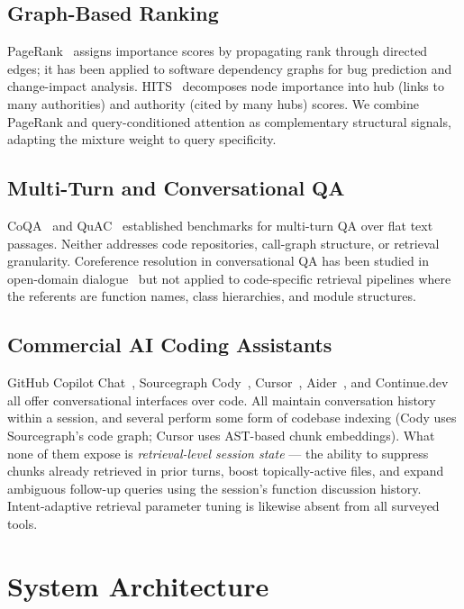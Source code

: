 \documentclass[runningheads]{llncs}
\begin{document}
\subsection{Graph-Based Ranking}

PageRank~\cite{brin1998pagerank} assigns importance scores by
propagating rank through directed edges; it has been applied to
software dependency graphs for bug prediction and change-impact
analysis. HITS~\cite{kleinberg1999hits} decomposes node importance
into hub (links to many authorities) and authority (cited by many
hubs) scores. We combine PageRank and query-conditioned attention
as complementary structural signals, adapting the mixture weight
to query specificity.

\subsection{Multi-Turn and Conversational QA}

CoQA~\cite{reddy2019coqa} and QuAC~\cite{choi2018quac} established
benchmarks for multi-turn QA over flat text passages. Neither
addresses code repositories, call-graph structure, or retrieval
granularity. Coreference resolution in conversational QA has been
studied in open-domain dialogue~\cite{choi2018quac} but not applied
to code-specific retrieval pipelines where the referents are
function names, class hierarchies, and module structures.

\subsection{Commercial AI Coding Assistants}

GitHub Copilot Chat~\cite{githubcopilot}, Sourcegraph
Cody~\cite{cody}, Cursor~\cite{cursor}, Aider~\cite{aider},
and Continue.dev~\cite{continuedev} all offer conversational
interfaces over code. All maintain conversation history within a
session, and several perform some form of codebase indexing
(Cody uses Sourcegraph's code graph; Cursor uses AST-based chunk
embeddings). What none of them expose is
\emph{retrieval-level session state} --- the ability to suppress
chunks already retrieved in prior turns, boost topically-active
files, and expand ambiguous follow-up queries using the session's
function discussion history. Intent-adaptive retrieval parameter
tuning is likewise absent from all surveyed tools.

\section{System Architecture}
\label{sec:architecture}
\end{document}
